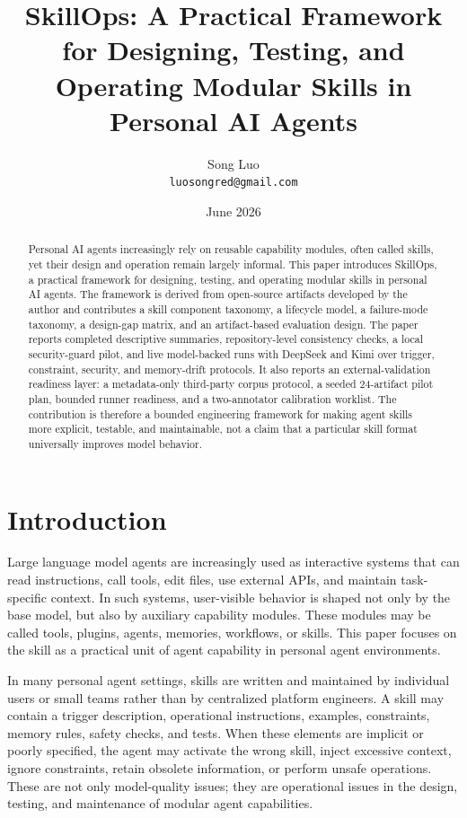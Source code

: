 \documentclass[11pt]{article}
\title{
SkillOps: A Practical Framework for Designing, Testing, and Operating
Modular Skills in Personal AI Agents
}
\author{
Song Luo\\
\texttt{luosongred@gmail.com}
}
\date{June 2026}
\begin{document}
\maketitle

\begin{abstract}
Personal AI agents increasingly rely on reusable capability modules, often
called skills, yet their design and operation remain largely informal. This
paper introduces SkillOps, a practical framework for designing, testing, and
operating modular skills in personal AI agents. The framework is derived from
open-source artifacts developed by the author and contributes a skill component
taxonomy, a lifecycle model, a failure-mode taxonomy, a design-gap matrix, and
an artifact-based evaluation design. The paper reports completed descriptive
summaries, repository-level consistency checks, a local security-guard pilot,
and live model-backed runs with DeepSeek and Kimi over trigger, constraint,
security, and memory-drift protocols. It also reports an external-validation
readiness layer: a metadata-only third-party corpus protocol, a seeded
24-artifact pilot plan, bounded runner readiness, and a two-annotator
calibration worklist. The contribution is therefore a bounded engineering
framework for making agent skills more explicit, testable, and maintainable,
not a claim that a particular skill format universally improves model behavior.
\end{abstract}

\section{Introduction}

Large language model agents are increasingly used as interactive systems that
can read instructions, call tools, edit files, use external APIs, and maintain
task-specific context. In such systems, user-visible behavior is shaped not
only by the base model, but also by auxiliary capability modules. These modules
may be called tools, plugins, agents, memories, workflows, or skills. This
paper focuses on the skill as a practical unit of agent capability in personal
agent environments.

In many personal agent settings, skills are written and maintained by
individual users or small teams rather than by centralized platform engineers.
A skill may contain a trigger description, operational instructions, examples,
constraints, memory rules, safety checks, and tests. When these elements are
implicit or poorly specified, the agent may activate the wrong skill, inject
excessive context, ignore constraints, retain obsolete information, or perform
unsafe operations. These are not only model-quality issues; they are
operational issues in the design, testing, and maintenance of modular agent
capabilities.
\end{document}
